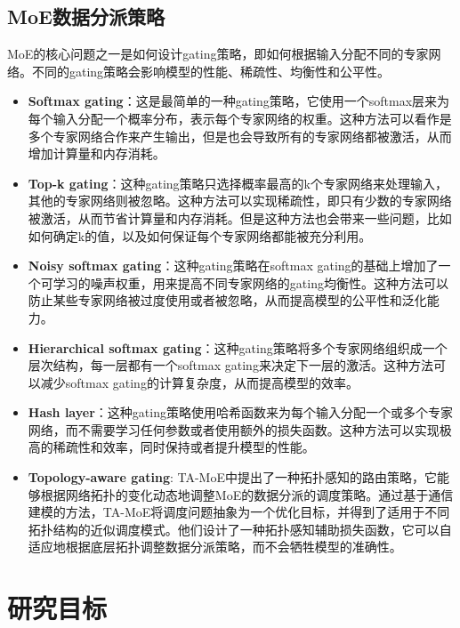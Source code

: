 \subsection{MoE数据分派策略}
MoE的核心问题之一是如何设计gating策略，即如何根据输入分配不同的专家网络。不同的gating策略会影响模型的性能、稀疏性、均衡性和公平性。
\begin{itemize}
    \item \textbf{Softmax gating}：这是最简单的一种gating策略，它使用一个softmax层来为每个输入分配一个概率分布，表示每个专家网络的权重。这种方法可以看作是多个专家网络合作来产生输出，但是也会导致所有的专家网络都被激活，从而增加计算量和内存消耗。
    \item \textbf{Top-k gating}：这种gating策略只选择概率最高的k个专家网络来处理输入，其他的专家网络则被忽略。这种方法可以实现稀疏性，即只有少数的专家网络被激活，从而节省计算量和内存消耗。但是这种方法也会带来一些问题，比如如何确定k的值，以及如何保证每个专家网络都能被充分利用。
    \item \textbf{Noisy softmax gating}：这种gating策略在softmax gating的基础上增加了一个可学习的噪声权重，用来提高不同专家网络的gating均衡性。这种方法可以防止某些专家网络被过度使用或者被忽略，从而提高模型的公平性和泛化能力。
    \item \textbf{Hierarchical softmax gating}：这种gating策略将多个专家网络组织成一个层次结构，每一层都有一个softmax gating来决定下一层的激活。这种方法可以减少softmax gating的计算复杂度，从而提高模型的效率。
    \item \textbf{Hash layer}：这种gating策略使用哈希函数来为每个输入分配一个或多个专家网络，而不需要学习任何参数或者使用额外的损失函数。这种方法可以实现极高的稀疏性和效率，同时保持或者提升模型的性能。
    \item \textbf{Topology-aware gating}: TA-MoE中提出了一种拓扑感知的路由策略，它能够根据网络拓扑的变化动态地调整MoE的数据分派的调度策略。通过基于通信建模的方法，TA-MoE将调度问题抽象为一个优化目标，并得到了适用于不同拓扑结构的近似调度模式。他们设计了一种拓扑感知辅助损失函数，它可以自适应地根据底层拓扑调整数据分派策略，而不会牺牲模型的准确性。
\end{itemize}



\section{研究目标}

